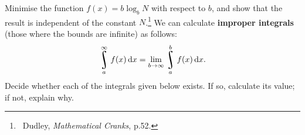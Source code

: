 \begin{questions}
  \questioE Minimise the function $ f(x) = b\log_b N $ with respect to $ b $, and show that the result is independent of the
            constant $ N $.\footnote{~Dudley, \textit{Mathematical Cranks}, p.52.}
  \questioS We can calculate \textbf{improper integrals} (those where the bounds are infinite) as follows:
            \begin{displaymath}
              \rint^{\infty}_a f(x) \dif{x} = \lim_{b \to \infty} \rint^b_a f(x) \dif{x}.
            \end{displaymath}
            Decide whether each of the integrals given below exists. If so, calculate its value; if not, explain why.
\end{questions}
